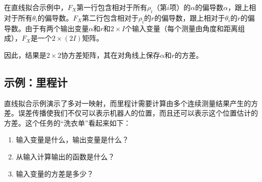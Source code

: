 在直线拟合示例中，$F_X$第一行包含相对于所有$\rho_i$（第$i$项）的$\alpha$的偏导数$\alpha$，跟上相对于所有$\theta_i$的偏导数。$F_X$第二行包含相对于$\rho_i$的$r$的偏导数，跟上相对于$\theta_i$的$r$的偏导数。由于有两个输出变量$\alpha$和$r$和$2\times I$个输入变量（每个测量由角度和距离组成），$F_X$是一个$2\times (2I)$矩阵。


因此，结果是$2\times 2$协方差矩阵，其在对角线上保存$\alpha$和$r$的方差。

\subsection{示例：里程计}


直线拟合示例演示了多对一映射，而里程计需要计算由多个连续测量结果产生的方差。误差传播使我们不仅可以表示机器人的位置，而且还可以表示这个位置估计的方差。这个任务的“洗衣单”看起来如下：

\begin{enumerate}

\item 输入变量是什么，输出变量是什么？
\item 从输入计算输出的函数是什么？
\item 输入变量的方差是多少？
\end{enumerate}


